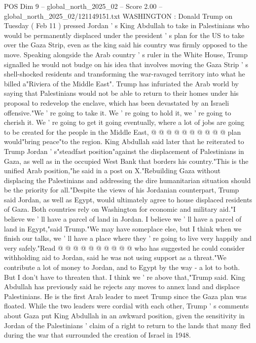 \begin{textsample}{POS Dim 9 – global\_north\_2025\_02 – Score 2.00 – global\_north\_2025\_02/121149151.txt}  \label{ex:f9_pos_385}
WASHINGTON : Donald Trump on Tuesday ( Feb 11 ) pressed Jordan ' s King Abdullah to take in Palestinians who would be permanently displaced under the president ' s plan for the US to take over the Gaza Strip, even as the king said his country was firmly opposed to the move.
Speaking alongside the Arab country ' s ruler in the White House, Trump signalled he would not budge on his idea that involves moving the Gaza Strip ' s shell-shocked residents and transforming the war-ravaged territory into what he billed a"Riviera of the Middle East".
Trump has infuriated the Arab world by saying that Palestinians would not be able to return to their homes under his proposal to redevelop the enclave, which has been devastated by an Israeli offensive."We ' re going to take it.
We ' re going to hold it, we ' re going to cherish it.
We ' re going to get it going eventually, where a lot of jobs are going to be created for the people in the Middle East, @ @ @ @ @ @ @ @ @ @ plan would"bring peace"to the region.
King Abdullah said later that he reiterated to Trump Jordan ' s"steadfast position"against the displacement of Palestinians in Gaza, as well as in the occupied West Bank that borders his country."This is the unified Arab position,"he said in a post on X."Rebuilding Gaza without displacing the Palestinians and addressing the dire humanitarian situation should be the priority for all."Despite the views of his Jordanian counterpart, Trump said Jordan, as well as Egypt, would ultimately agree to house displaced residents of Gaza.
Both countries rely on Washington for economic and military aid."I believe we ' ll have a parcel of land in Jordan.
I believe we ' ll have a parcel of land in Egypt,"said Trump."We may have someplace else, but I think when we finish our talks, we ' ll have a place where they ' re going to live very happily and very safely."Read @ @ @ @ @ @ @ @ @ @ who has suggested he could consider withholding aid to Jordan, said he was not using support as a threat."We contribute a lot of money to Jordan, and to Egypt by the way - a lot to both.
But I don't have to threaten that.
I think we ' re above that,"Trump said.
King Abdullah has previously said he rejects any moves to annex land and displace Palestinians.
He is the first Arab leader to meet Trump since the Gaza plan was floated.
While the two leaders were cordial with each other, Trump ' s comments about Gaza put King Abdullah in an awkward position, given the sensitivity in Jordan of the Palestinians ' claim of a right to return to the lands that many fled during the war that surrounded the creation of Israel in 1948.

\end{textsample}
